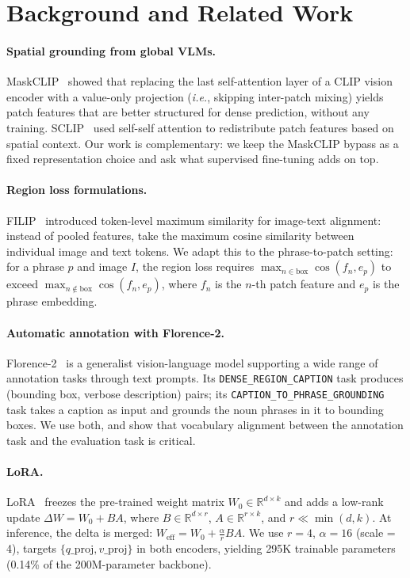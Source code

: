 \documentclass{article}
\newcommand{\ie}{\textit{i.e.}}
\begin{document}
\section{Background and Related Work}
\label{sec:background}

\paragraph{Spatial grounding from global VLMs.}
MaskCLIP~\cite{zhou2022maskclip} showed that replacing the last self-attention
layer of a CLIP vision encoder with a value-only projection (\ie, skipping
inter-patch mixing) yields patch features that are better structured for dense
prediction, without any training.  SCLIP~\cite{wang2023sclip} used
self-self attention to redistribute patch features based on spatial context.
Our work is complementary: we keep the MaskCLIP bypass as a fixed
representation choice and ask what supervised fine-tuning adds on top.

\paragraph{Region loss formulations.}
FILIP~\cite{yao2021filip} introduced token-level maximum similarity for
image-text alignment: instead of pooled features, take the maximum cosine
similarity between individual image and text tokens.  We adapt this to the
phrase-to-patch setting: for a phrase $p$ and image $I$, the region loss
requires $\max_{n \in \text{box}} \cos(f_n, e_p)$ to exceed
$\max_{n \notin \text{box}} \cos(f_n, e_p)$, where $f_n$ is the $n$-th patch
feature and $e_p$ is the phrase embedding.

\paragraph{Automatic annotation with Florence-2.}
Florence-2~\cite{xiao2024florence2} is a generalist vision-language model
supporting a wide range of annotation tasks through text prompts.  Its
\texttt{DENSE\_REGION\_CAPTION} task produces (bounding box, verbose
description) pairs; its \texttt{CAPTION\_TO\_PHRASE\_GROUNDING} task takes a
caption as input and grounds the noun phrases in it to bounding boxes.  We use
both, and show that vocabulary alignment between the annotation task and the
evaluation task is critical.

\paragraph{LoRA.}
LoRA~\cite{hu2022lora} freezes the pre-trained weight matrix $W_0 \in
\mathbb{R}^{d \times k}$ and adds a low-rank update $\Delta W = W_0 + B A$,
where $B \in \mathbb{R}^{d \times r}$, $A \in \mathbb{R}^{r \times k}$, and
$r \ll \min(d, k)$.  At inference, the delta is merged: $W_{\text{eff}} = W_0
+ \frac{\alpha}{r} B A$.  We use $r = 4$, $\alpha = 16$ (scale = 4), targets
$\{q\_\text{proj}, v\_\text{proj}\}$ in both encoders, yielding 295K trainable
parameters (0.14\% of the 200M-parameter backbone).
\end{document}
